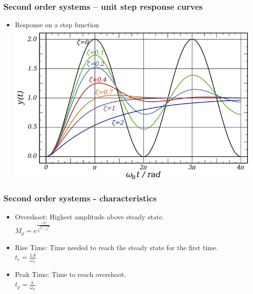 \begin{frame}
\frametitle{Second order systems – unit step response curves}
\begin{itemize}
\item Response on a step function
\\ \vspace{1cm} \includegraphics[width=0.8\linewidth]{Afbeelding6}
\end{itemize}
\end{frame}

\begin{frame}
\frametitle{Second order systems - characteristics}
\begin{itemize}
\item Overshoot: Highest amplitude above steady state.
\\ $M_p = e^{\frac{-\pi\zeta}{\sqrt{1-\zeta^2}}}$
\vspace{0.12cm}
\item Rise Time: Time needed to reach the steady state for the first time.
\\ $t_r = \frac{1.8}{\omega_n}$
\vspace{0.12cm}
\item Peak Time: Time to reach overshoot.
\\ $t_p =\frac{\pi}{\omega_d}$
\\ \begin{figure}
\end{figure}
\end{itemize}
\end{frame}

